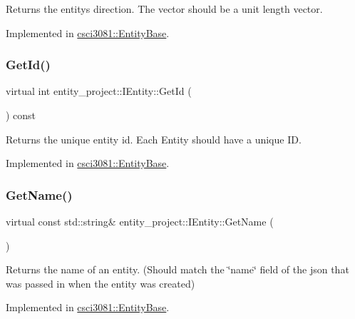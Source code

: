 Returns the entity\textquotesingle{}s direction. The vector should be a unit length vector. 

Implemented in \hyperlink{classcsci3081_1_1EntityBase_aeffff43e1d9b696b0ea3de83f7bee37d}{csci3081\+::\+Entity\+Base}.

\mbox{\label{classentity__project_1_1IEntity_a87f9d99f58cdc28b654ae9a6d82fbff6}} 
\subsubsection{\texorpdfstring{Get\+Id()}{GetId()}}
{\footnotesize\ttfamily virtual int entity\+\_\+project\+::\+I\+Entity\+::\+Get\+Id (\begin{DoxyParamCaption}{ }\end{DoxyParamCaption}) const\hspace{0.3cm}{\ttfamily [pure virtual]}}

Returns the unique entity id. Each Entity should have a unique ID. 

Implemented in \hyperlink{classcsci3081_1_1EntityBase_a2802163d8d20092d985e763ad91d26da}{csci3081\+::\+Entity\+Base}.

\mbox{\label{classentity__project_1_1IEntity_a60fe17f543af26a48181a0c290a822ab}} 
\subsubsection{\texorpdfstring{Get\+Name()}{GetName()}}
{\footnotesize\ttfamily virtual const std\+::string\& entity\+\_\+project\+::\+I\+Entity\+::\+Get\+Name (\begin{DoxyParamCaption}{ }\end{DoxyParamCaption})\hspace{0.3cm}{\ttfamily [pure virtual]}}

Returns the name of an entity. (Should match the \char`\"{}name\char`\"{} field of the json that was passed in when the entity was created) 

Implemented in \hyperlink{classcsci3081_1_1EntityBase_ac18421e6e96eb3939e136a579c9ac6dd}{csci3081\+::\+Entity\+Base}.


